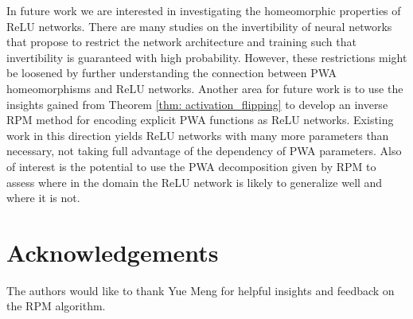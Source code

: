 \documentclass[letterpaper, 10 pt, conference]{ieeeconf}  %
\begin{document}
In future work we are interested in investigating the homeomorphic properties of ReLU networks. 
There are many studies on the invertibility of neural networks that propose to restrict the network architecture and training such that invertibility is guaranteed with high probability. 
However, these restrictions might be loosened by further understanding the connection between PWA homeomorphisms and ReLU networks. Another area for future work is to use the insights gained from Theorem \ref{thm: activation_flipping} to develop an inverse RPM method for encoding explicit PWA functions as ReLU networks. 
Existing work in this direction yields ReLU networks with many more parameters than necessary, not taking full advantage of the dependency of PWA parameters. Also of interest is the potential to use the PWA decomposition given by RPM to assess where in the domain the ReLU network is likely to generalize well and where it is not.






\section*{Acknowledgements}
The authors would like to thank Yue Meng for helpful insights and feedback on the RPM algorithm.








\appendix 
\label{Sec:Appendix}

\end{document}
